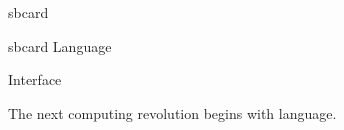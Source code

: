 {\begin{center}
\begin{minipage}[t]{0.176\textwidth}
\begin{beamercolorbox}[wd=\linewidth,ht=1.30cm,dp=0.14cm,sep=0.14cm,center,rounded=true,shadow=false]{sbcard}
\end{beamercolorbox}
\end{minipage}
\hspace{0.012\textwidth}
\begin{minipage}[t]{0.176\textwidth}
\begin{beamercolorbox}[wd=\linewidth,ht=1.30cm,dp=0.14cm,sep=0.14cm,center,rounded=true,shadow=false]{sbcard}
{\SBFontTitle\fontsize{10.0}{12}\selectfont\color{SBText}Language}\par
\vspace{0.07cm}
{\SBFontBody\fontsize{8.2}{9.8}\selectfont\color{SBMuted}Interface}
\end{beamercolorbox}
\end{minipage}
\end{center}

\vspace{0.30cm}

\begin{center}
{\SBFontBody\fontsize{11.2}{14}\selectfont\color{SBMuted}The next computing revolution begins with language.}
\end{center}
}
